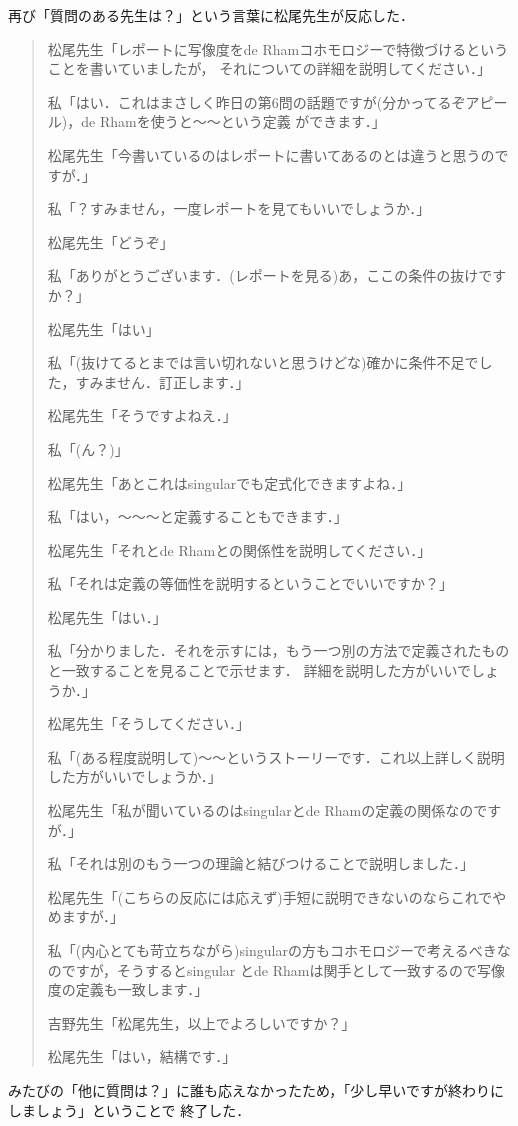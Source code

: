 \documentclass[dvipdfmx,uplatex]{jsarticle}
\begin{document}
再び「質問のある先生は？」という言葉に松尾先生が反応した．
\begin{quote}
  松尾先生「レポートに写像度をde Rhamコホモロジーで特徴づけるということを書いていましたが，
  それについての詳細を説明してください．」

  私「はい．これはまさしく昨日の第6問の話題ですが(分かってるぞアピール)，de Rhamを使うと～～という定義
  ができます．」

  松尾先生「今書いているのはレポートに書いてあるのとは違うと思うのですが．」

  私「？すみません，一度レポートを見てもいいでしょうか．」

  松尾先生「どうぞ」

  私「ありがとうございます．(レポートを見る)あ，ここの条件の抜けですか？」

  松尾先生「はい」

  私「(抜けてるとまでは言い切れないと思うけどな)確かに条件不足でした，すみません．訂正します．」

  松尾先生「そうですよねえ．」

  私「(ん？)」

  松尾先生「あとこれはsingularでも定式化できますよね．」

  私「はい，～～～と定義することもできます．」

  松尾先生「それとde Rhamとの関係性を説明してください．」

  私「それは定義の等価性を説明するということでいいですか？」

  松尾先生「はい．」

  私「分かりました．それを示すには，もう一つ別の方法で定義されたものと一致することを見ることで示せます．
  詳細を説明した方がいいでしょうか．」

  松尾先生「そうしてください．」

  私「(ある程度説明して)～～というストーリーです．これ以上詳しく説明した方がいいでしょうか．」

  松尾先生「私が聞いているのはsingularとde Rhamの定義の関係なのですが．」

  私「それは別のもう一つの理論と結びつけることで説明しました．」

  松尾先生「(こちらの反応には応えず)手短に説明できないのならこれでやめますが．」

  私「(内心とても苛立ちながら)singularの方もコホモロジーで考えるべきなのですが，そうするとsingular
  とde Rhamは関手として一致するので写像度の定義も一致します．」

  吉野先生「松尾先生，以上でよろしいですか？」

  松尾先生「はい，結構です．」
\end{quote}
みたびの「他に質問は？」に誰も応えなかったため，「少し早いですが終わりにしましょう」ということで
終了した．
\end{document}
